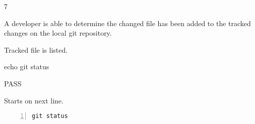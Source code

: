 \begin{description}[align=right,leftmargin=3.2cm,labelindent=3.0cm]
\item[Step:] 7
\item[Confirm:] A developer is able to determine the changed file has been added to the tracked changes on the local git repository.
\item[Expectation:] Tracked file is listed.
\item[Command:] echo git  status
\item[Test Result:] PASS
\item[Evidence:] Starts on next line.
\end{description}
\begin{lstlisting}[numbers=left]
git status

\end{lstlisting}
